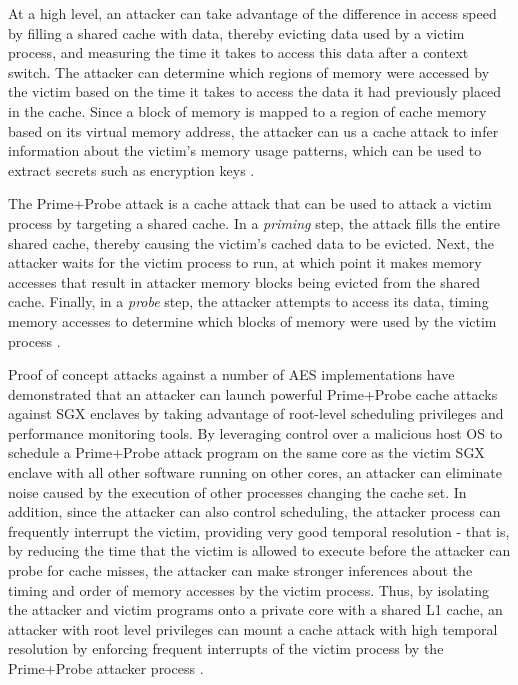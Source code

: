 At a high level, an attacker can take advantage of the difference in access speed by filling a shared cache with data, thereby evicting data used by a victim process, and measuring the time it takes to access this data after a context switch. The attacker can determine which regions of memory were accessed by the victim based on the time it takes to access the data it had previously placed in the cache. Since a block of memory is mapped to a region of cache memory based on its virtual memory address, the attacker can us a cache attack to infer information about the victim's memory usage patterns, which can be used to extract secrets such as encryption keys \cite{moghimi_cachezoom:_2017, gotzfried_cache_2017}.

The Prime+Probe attack is a cache attack that can be used to attack a victim process by targeting a shared cache. In a \emph{priming} step, the attack fills the entire shared cache, thereby causing the victim's cached data to be evicted. Next, the attacker waits for the victim process to run, at which point it makes memory accesses that result in attacker memory blocks being evicted from the shared cache. Finally, in a \emph{probe} step, the attacker attempts to access its data, timing memory accesses to determine which blocks of memory were used by the victim process \cite{moghimi_cachezoom:_2017, gotzfried_cache_2017}.

Proof of concept attacks against a number of AES implementations have demonstrated that an attacker can launch powerful Prime+Probe cache attacks against SGX enclaves by taking advantage of root-level scheduling privileges and performance monitoring tools. By leveraging control over a malicious host OS to schedule a Prime\-+Probe attack program on the same core as the victim SGX enclave with all other software running on other cores, an attacker can eliminate noise caused by the execution of other processes changing the cache set. In addition, since the attacker can also control scheduling, the attacker process can frequently interrupt the victim, providing very good temporal resolution - that is, by reducing the time that the victim is allowed to execute before the attacker can probe for cache misses, the attacker can make stronger inferences about the timing and order of memory accesses by the victim process. Thus, by isolating the attacker and victim programs onto a private core with a shared L1 cache, an attacker with root level privileges can mount a cache attack with high temporal resolution by enforcing frequent interrupts of the victim process by the Prime+Probe attacker process \cite{moghimi_cachezoom:_2017, gotzfried_cache_2017}.

